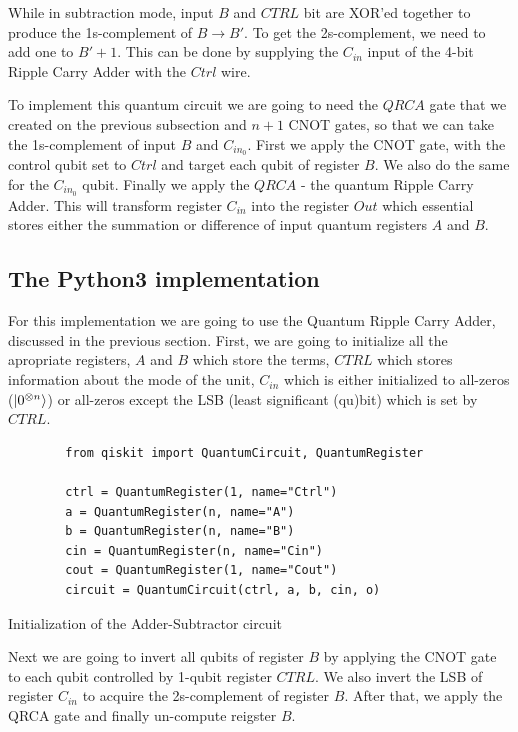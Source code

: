 While in subtraction mode, input $B$ and $CTRL$ bit are XOR'ed together to produce the 1s-complement of $B \rightarrow B'$.
To get the 2s-complement, we need to add one to $B' + 1$. This can be done by supplying the $C_{in}$ input of the
4-bit Ripple Carry Adder with the $Ctrl$ wire.

To implement this quantum circuit we are going to need the $QRCA$ gate that we created on the previous subsection and
$n+1$ CNOT gates, so that we can take the 1s-complement of input $B$ and $C_{in_{0}}$. First we apply the CNOT gate, with
the control qubit set to $Ctrl$ and target each qubit of register $B$. We also do the same for the $C_{in_{0}}$ qubit.
Finally we apply the $QRCA$ - the quantum Ripple Carry Adder. This will transform register $C_{in}$ into the register $Out$
which essential stores either the summation or difference of input quantum registers $A$ and $B$.

\subsection{The Python3 implementation}

For this implementation we are going to use the Quantum Ripple Carry Adder, discussed in the previous section.
First, we are going to initialize all the apropriate registers, $A$ and $B$ which store the terms, $CTRL$ which
stores information about the mode of the unit, $C_{in}$ which is either initialized to all-zeros ($\ket{0^{\otimes n}}$)
or all-zeros except the LSB (least significant (qu)bit) which is set by $CTRL$.

\begin{listing}[!ht]
    \centering
    \begin{verbatim}
        from qiskit import QuantumCircuit, QuantumRegister

        ctrl = QuantumRegister(1, name="Ctrl")
        a = QuantumRegister(n, name="A")
        b = QuantumRegister(n, name="B")
        cin = QuantumRegister(n, name="Cin")
        cout = QuantumRegister(1, name="Cout")
        circuit = QuantumCircuit(ctrl, a, b, cin, o)
    \end{verbatim}
    \caption{Initialization of the Adder-Subtractor circuit}
\end{listing}

Next we are going to invert all qubits of register $B$ by applying the CNOT gate to each qubit controlled by 1-qubit
register $CTRL$. We also invert the LSB of register $C_{in}$ to acquire the 2s-complement of register $B$. After that,
we apply the QRCA gate and finally un-compute reigster $B$.

